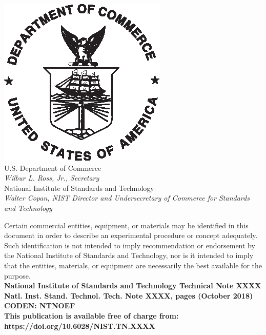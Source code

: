 \documentclass[12pt]{article}
\newcommand{\pubnumber}{XXXX}
\newcommand{\DOI}{https://doi.org/10.6028/NIST.TN.XXXX}
\newcommand{\monthyear}{October 2018}
\begin{document}
\begin{titlepage}
\begin{flushright}
\includegraphics[width=0.18\linewidth]{DoC-logo.eps}\\
\vfill
\footnotesize U.S. Department of Commerce\\
\textit{Wilbur L. Ross, Jr., Secretary}\\
\vspace{10pt}
National Institute of Standards and Technology\\
\textit{Walter Copan, NIST Director and Undersecretary of Commerce for Standards and Technology}
\end{flushright}
\end{titlepage}

\begin{titlepage}
\begin{flushright}
\footnotesize  Certain commercial entities, equipment, or materials may be identified in this document in order to describe an experimental procedure or concept adequately. Such identification is not intended to imply recommendation or endorsement by the National Institute of Standards and Technology, nor is it intended to imply that the entities, materials, or equipment are necessarily the best available for the purpose.\\
\vfill
\normalsize \textbf{National Institute of Standards and Technology Technical Note \pubnumber\\
Natl. Inst. Stand. Technol. Tech. Note \pubnumber, \pageref{LastPage} pages (\monthyear)} \\
\textbf{CODEN: NTNOEF}\\
\vspace{12pt}
\textbf{This publication is available free of charge from: \DOI}
\vfill
\end{flushright}
\end{titlepage}
\end{document}
